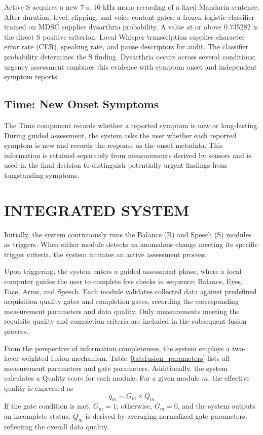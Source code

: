 \documentclass[conference]{IEEEtran}
\providecommand{\revisioncolor}{black}
\DeclareRobustCommand{\revised}[1]{{\color{\revisioncolor}#1}}
\begin{document}
Active S acquires a new 7-s, 16-kHz mono recording of a fixed Mandarin sentence.
After duration, level, clipping, and voice-content gates, a frozen logistic
classifier trained on MDSC supplies dysarthria probability. A value at or above 0.735282
is the direct S positive criterion. \revised{Local Whisper transcription supplies character error rate (CER), speaking rate, and pause descriptors for audit. The classifier probability determines the S finding. Dysarthria occurs across several conditions; urgency assessment combines this evidence with symptom onset and independent symptom reports.}

\subsection{Time: New Onset Symptoms}
\label{subsec}

The Time component records whether a reported symptom is new or long-lasting. During guided assessment, the system asks the user whether each reported symptom is new and records the response as the onset metadata. This information is retained separately from measurements derived by sensors and is used in the final decision to distinguish potentially urgent findings from longstanding symptoms.


\section{INTEGRATED SYSTEM}
\label{sec:fusion}


Initially, the system continuously runs the Balance (B) and Speech (S) modules as triggers. When either module detects an anomalous change meeting its specific trigger criteria, the system initiates an active assessment process.

Upon triggering, the system enters a guided assessment phase, where a local computer guides the user to complete five checks in sequence: Balance, Eyes, Face, Arms, and Speech. Each module validates collected data against predefined acquisition-quality gates and completion gates, recording the corresponding measurement parameters and data quality. Only measurements meeting the requisite quality and completion criteria are included in the subsequent fusion process.

From the perspective of information completeness, the system employs a two-layer weighted fusion mechanism.
Table~\ref{tab:fusion_parameters}
lists all measurement parameters and gate parameters.
Additionally, the system calculates a Quality score for each module.
For a given module \(m\), the effective quality is expressed as
\begin{equation}
q_m = G_m \times Q_m
\end{equation}
If the gate condition is met, \(G_m = 1\); otherwise, \(G_m = 0\), and the system outputs an incomplete status. \(Q_m\) is derived by averaging normalized gate parameters, reflecting the overall data quality.
\end{document}
